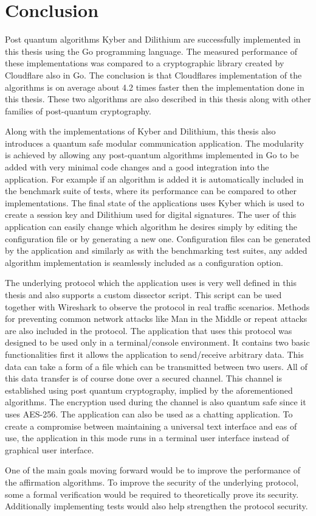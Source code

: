 \chapter*{Conclusion}
{}

Post quantum algorithms Kyber and Dilithium are successfully implemented in this thesis using the Go programming language. The measured performance of these implementations was compared to a cryptographic library created by Cloudflare also in Go. The conclusion is that Cloudflares implementation of the algorithms is on average about 4.2 times faster then the implementation done in this thesis. These two algorithms are also described in this thesis along with other families of post-quantum cryptography.

Along with the implementations of Kyber and Dilithium, this thesis also introduces a quantum safe modular communication application. The modularity is achieved by allowing any post-quantum algorithms implemented in Go to be added with very minimal code changes and a good integration into the application. For example if an algorithm is added it is automatically included in the benchmark suite of tests, where its performance can be compared to other implementations. The final state of the applications uses Kyber which is used to create a session key and Dilithium used for digital signatures. The user of this application can easily change which algorithm he desires simply by editing the configuration file or by generating a new one. Configuration files can be generated by the application and similarly as with the benchmarking test suites, any added algorithm implementation is seamlessly included as a configuration option.

The underlying protocol which the application uses is very well defined in this thesis and also supports a custom dissector script. This script can be used together with Wireshark to observe the protocol in real traffic scenarios. Methods for preventing common network attacks like Man in the Middle or repeat attacks are also included in the protocol. The application that uses this protocol was designed to be used only in a terminal/console environment. It contains two basic functionalities first it allows the application to send/receive arbitrary data. This data can take a form of a file which can be transmitted between two users. All of this data transfer is of course done over a secured channel. This channel is established using post quantum cryptography, implied by the aforementioned algorithms. The encryption used during the channel is also quantum safe since it uses AES-256. The application can also be used as a chatting application. To create a compromise between maintaining a universal text interface and eas of use, the application in this mode runs in a terminal user interface instead of graphical user interface.

One of the main goals moving forward would be to improve the performance of the affirmation algorithms. To improve the security of the underlying protocol, some a formal verification would be required to theoretically prove its security. Additionally implementing tests would also help strengthen the protocol security.
